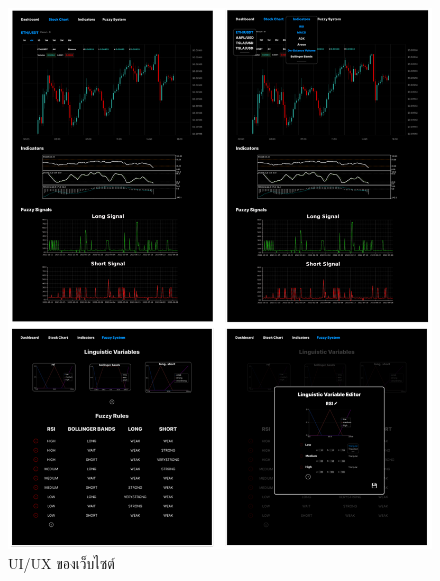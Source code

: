 \begin{figure}[ht]
    \centering
    \includegraphics[width=\textwidth]{images/web_uiux.png}
    \caption{UI/UX ของเว็บไซต์}
\end{figure}

